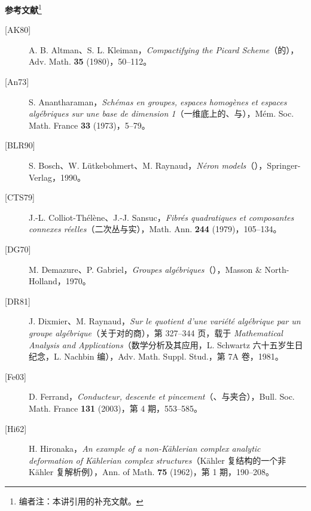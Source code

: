 \textbf{参考文献}\footnote{编者注：本讲引用的补充文献。}
\begin{description}
\item[{[AK80]}] A. B. Altman、S. L. Kleiman，\textit{Compactifying the Picard Scheme}（的），Adv. Math. \textbf{35} (1980)，50--112。
\item[{[An73]}] S. Anantharaman，\textit{Schémas en groupes, espaces homogènes et espaces algébriques sur une base de dimension 1}（一维底上的、与），Mém. Soc. Math. France \textbf{33} (1973)，5--79。
\item[{[BLR90]}] S. Bosch、W. Lütkebohmert、M. Raynaud，\textit{Néron models}（），Springer-Verlag，1990。
\item[{[CTS79]}] J.-L. Colliot-Thélène、J.-J. Sansuc，\textit{Fibrés quadratiques et composantes connexes réelles}（二次丛与实），Math. Ann. \textbf{244} (1979)，105--134。
\item[{[DG70]}] M. Demazure、P. Gabriel，\textit{Groupes algébriques}（），Masson \& North-Holland，1970。
\item[{[DR81]}] J. Dixmier、M. Raynaud，\textit{Sur le quotient d'une variété algébrique par un groupe algébrique}（关于对的商），第 327--344 页，载于 \textit{Mathematical Analysis and Applications}（数学分析及其应用，L. Schwartz 六十五岁生日纪念，L. Nachbin 编），Adv. Math. Suppl. Stud.，第 7A 卷，1981。
\item[{[Fe03]}] D. Ferrand，\textit{Conducteur, descente et pincement}（、与夹合），Bull. Soc. Math. France \textbf{131} (2003)，第 4 期，553--585。
\item[{[Hi62]}] H. Hironaka，\textit{An example of a non-Kählerian complex analytic deformation of Kählerian complex structures}（Kähler 复结构的一个非 Kähler 复解析例），Ann. of Math. \textbf{75} (1962)，第 1 期，190--208。
\end{description}
